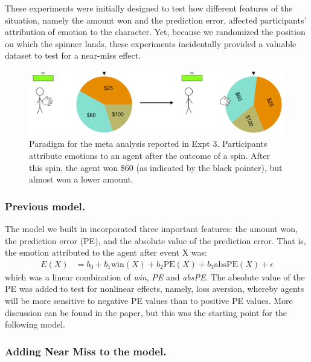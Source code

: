 \documentclass[10pt,letterpaper]{article}
\begin{document}
	These experiments were initially designed to test how different features of the situation, namely the amount won and the prediction error, affected participants' attribution of emotion to the character. Yet, because we randomized the position on which the spinner lands, these experiments incidentally provided a valuable dataset to test for a near-miss effect.

\begin{figure}[htb!]
\includegraphics[width=\columnwidth]{images/expt3Paradigm.png}
\caption{ Paradigm for the meta analysis reported in Expt 3. Participants attribute emotions to an agent after the outcome of a spin. After this spin, the agent won \$60 (as indicated by the black pointer), but almost won a lower amount. }
\label{Expt3ParadigmFig}
\end{figure}


\subsubsection{Previous model.} The model we built in  incorporated three important features: the amount won, the prediction error (PE), and the absolute value of the prediction error. That is, the emotion attributed to the agent after event X was:
\begin{align}
E(X) &= b_0 + b_1 \text{win}(X) + b_2 \text{PE}(X) + b_3 \text{absPE}(X) + \epsilon \label{PEModel}
\end{align}
which was a linear combination of \textit{win}, \textit{PE} and \textit{absPE}. The absolute value of the PE was added to test for nonlinear effects, namely, loss aversion, whereby agents will be more sensitive to negative PE values than to positive PE values. More discussion can be found in the paper, but this was the starting point for the following model.


\subsubsection{Adding Near Miss to the model.}

\end{document}
